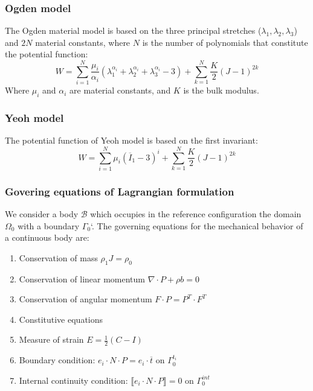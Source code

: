\subsubsection*{Ogden model}
The Ogden \citep{ogden_large_1972} material model is based on the three principal stretches ($\lambda_1,\lambda_2,\lambda_3$) and $2N$ material constants, where $N$ is the number of polynomials that constitute the potential function:
\begin{equation}
\label{eq:ogdenmodel}
W= \sum^N_{i = 1} \frac{\mu_i}{\alpha_i}(\lambda_1^{\alpha_i}+\lambda_2^{\alpha_i}+\lambda_3^{\alpha_i}-3) + \sum_{k=1}^N \frac{K}{2}(J-1)^{2k}
\end{equation}
Where $\mu_i$ and $\alpha_i$ are material constants, and $K$ is the bulk modulus.

\subsubsection*{Yeoh model}
The potential function of Yeoh \citep{yeoh_characterization_1990} model is based on the first invariant:
\begin{equation}
\label{eq:yeohmodel}
W = \sum_{i=1}^N \mu_i(\overline{I}_1 - 3)^i + \sum_{k=1}^N \frac{K}{2}(J-1)^{2k}
\end{equation}


\subsubsection*{Govering equations of Lagrangian formulation} 
We consider a body $\mathcal{B}$ which occupies in the reference configuration the domain $\Omega_0$ with a boundary $\Gamma_0$`. The governing equations for the mechanical behavior of a continuous body are:
\begin{enumerate}
\item Conservation of mass $\rho_1 J = \rho_0$
\item Conservation of linear momentum $\nabla \cdot P + \rho b = 0$
\item Conservation of angular momentum $F \cdot P = P^T \cdot F^T$
\item Constitutive equations
\item Measure of strain $E = \frac{1}{2} (C-I)$
\item Boundary condition: $e_i \cdot N \cdot P = e_i \cdot \overline{t}$ on $\Gamma_0^{t_i}$
\item Internal continuity condition: $\llbracket e_i \cdot N \cdot P \rrbracket = 0$ on $\Gamma_0^{int}$
\end{enumerate} 

